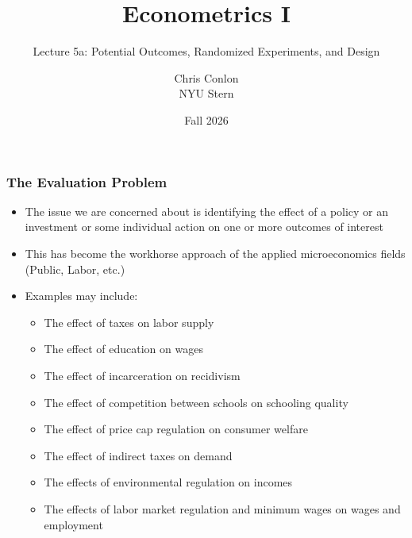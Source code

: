 \documentclass[aspectratio=169,11pt]{beamer}
\title[L5a - Experiments]{ Econometrics I}
\subtitle{Lecture 5a: Potential Outcomes, Randomized Experiments, and Design}
\author{Chris Conlon \\NYU Stern}
\date{Fall 2026}
\begin{document}
\frame{\titlepage}


\begin{frame}
\frametitle{The Evaluation Problem}
\begin{itemize}
\item The issue we are concerned about is identifying the effect of a policy or an investment or some individual action on one or more outcomes of interest
\item This has become the workhorse approach of the applied microeconomics fields (Public, Labor, etc.)
\item Examples may include:
\begin{itemize}
\item The effect of taxes on labor supply
\item The effect of education on wages
\item The effect of incarceration on recidivism
\item The effect of competition between schools on schooling quality
\item The effect of price cap regulation on consumer welfare
\item The effect of indirect taxes on demand
\item The effects of environmental regulation on incomes
\item The effects of labor market regulation and minimum wages on wages and employment
\end{itemize}
\end{itemize}
\end{frame}
\end{document}
